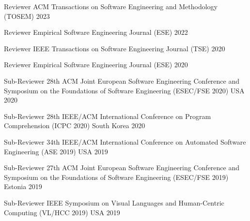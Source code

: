 \begin{cvhonors}

  \cvhonor
    {Reviewer} %
    {{ACM} Transactions on Software Engineering and Methodology ({TOSEM})} %
    {} %
    {2023} %

  \cvhonor
    {Reviewer} %
    {Empirical Software Engineering Journal ({ESE})} %
    {} %
    {2022} %

  \cvhonor
    {Reviewer} %
    {{IEEE} Transactions on Software Engineering Journal ({TSE})} %
    {} %
    {2020} %

  \cvhonor
    {Reviewer} %
    {Empirical Software Engineering Journal ({ESE})} %
    {} %
    {2020} %

  \cvhonor
    {Sub-Reviewer} %
    {28th {ACM} Joint European Software Engineering Conference and Symposium on the Foundations of Software Engineering ({ESEC/FSE} 2020)} %
    {USA} %
    {2020} %

  \cvhonor
    {Sub-Reviewer} %
    {28th {IEEE}/{ACM} International Conference on Program Comprehension ({ICPC} 2020)} %
    {South Korea} %
    {2020} %

  \cvhonor
    {Sub-Reviewer} %
    {34th {IEEE}/{ACM} International Conference on Automated Software Engineering ({ASE} 2019)} %
    {USA} %
    {2019} %

  \cvhonor
    {Sub-Reviewer} %
    {27th {ACM} Joint European Software Engineering Conference and Symposium on the Foundations of Software Engineering ({ESEC/FSE} 2019)} %
    {Estonia} %
    {2019} %

  \cvhonor
    {Sub-Reviewer} %
    {{IEEE} Symposium on Visual Languages and Human-Centric Computing ({VL/HCC} 2019)} %
    {USA} %
    {2019} %


\end{cvhonors}

